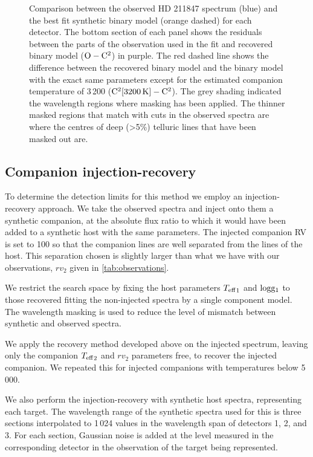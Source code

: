 \begin{figure*}
    \centering
    \caption{Comparison between the observed {HD 211847} spectrum (blue) and the best fit synthetic binary model (orange dashed) for each detector.
The bottom section of each panel shows the residuals between the parts of the observation used in the \textchisquared{} fit and recovered binary model (\(\rm O-C^2\)) in purple.
The red dashed line shows the difference between the recovered binary model and the binary model with the exact same parameters except for the estimated companion temperature of 3\,200\K{} (\(\rm C^2[3200\,\si{\kelvin}{}]- C^2\)).
The grey shading indicated the wavelength regions where masking has been applied.
The thinner masked regions that match with cuts in the observed spectra are where the centres of deep (>5\%) telluric lines that have been masked out are.}
    \label{fig:visualinspection-hd2118471}
\end{figure*}


\subsection{Companion injection-recovery}
\label{subsec:injection-recovery}
To determine the detection limits for this method we employ an injection-recovery approach.
We take the observed spectra and inject onto them a synthetic companion, at the absolute flux ratio to which it would have been added to a synthetic host with the same parameters.
The injected companion {RV} is set to 100\kmps{} so that the companion lines are well separated from the lines of the host.
This separation chosen is slightly larger than what we have with our observations, \(rv_2\) given in \cref{tab:observations}.

We restrict the search space by fixing the host parameters \({T_{\mathrm{eff}}}_{1}\) and \(\textrm{logg}{}_1\) to those recovered fitting the non-injected spectra by a single component model.
The wavelength masking is used to reduce the level of mismatch between synthetic and observed spectra.

We apply the recovery method developed above on the injected spectrum, leaving only the companion \({T_{\mathrm{eff}}}_{2}\) and \({rv}_2\) parameters free, to recover the injected companion.
We repeated this for injected companions with temperatures below 5\,000\K{}.

We also perform the injection-recovery with synthetic host spectra, representing each target.
The wavelength range of the synthetic spectra used for this is three sections interpolated to 1\,024 values in the wavelength span of detectors 1, 2, and 3.
For each section, Gaussian noise is added at the level measured in the corresponding detector in the observation of the target being represented.

